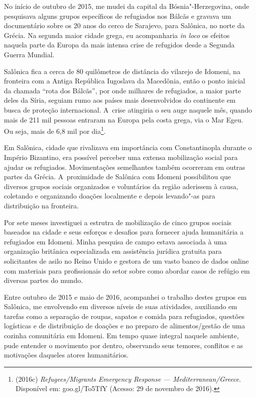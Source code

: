  

No início de outubro de 2015, me mudei da capital da Bósnia"-Herzegovina,
onde pesquisava alguns grupos específicos de refugiados nos Bálcãs e
gravava um documentário sobre os 20 anos do cerco de Sarajevo, para
Salônica, no norte da Grécia. Na segunda maior cidade grega, eu
acompanharia \emph{in loco} os efeitos naquela parte da Europa da mais
intensa crise de refugidos desde a Segunda Guerra Mundial.

Salônica fica a cerca de 80 quilômetros de distância do vilarejo de
Idomeni, na fronteira com a Antiga República Iugoslava da Macedônia,
então o ponto inicial da chamada ``rota dos Bálcãs'', por onde milhares
de refugiados, a maior parte deles da Síria, seguiam rumo aos países
mais desenvolvidos do continente em busca de proteção internacional. A~crise atingiria o seu auge naquele mês, quando mais de 211 mil pessoas
entraram na Europa pela costa grega, via o Mar Egeu. Ou seja, mais de
6,8 mil por dia\footnote{ (2016c) \emph{Refugees/Migrants Emergency Response ---
Mediterranean/Greece}. Disponível em:
goo.gl/To5TfY (Acesso: 29 de
novembro de 2016).}.

Em Salônica, cidade que rivalizava em importância com Constantinopla
durante o Império Bizantino, era possível perceber uma extensa
mobilização social para ajudar os refugiados. Movimentações semelhantes
também ocorreram em outras partes da Grécia. A~proximidade de Salônica
com Idomeni possibilitou que diversos grupos sociais organizados e
voluntários da região aderissem à causa, coletando e organizando doações
localmente e depois levando"-as para distribuição na fronteira.

Por sete meses investiguei a estrutra de mobilização de cinco grupos
sociais baseados na cidade e seus esforços e desafios para fornecer
ajuda humanitária a refugiados em Idomeni. Minha pesquisa de campo
estava associada à uma organização britânica especializada em
assistência jurídica gratuita para solicitantes de asilo no Reino Unido
e gestora de um vasto banco de dados online com materiais para
profissionais do setor sobre como abordar casos de refúgio em diversas
partes do mundo.

Entre outubro de 2015 e maio de 2016, acompanhei o trabalho destes
grupos em Salônica, me envolvendo em diversos níveis de suas atividades,
auxiliando em tarefas como a separação de roupas, sapatos e comida para
refugiados, questões logísticas e de distribuição de doações e no
preparo de alimentos/gestão de uma cozinha comunitária em Idomeni. Em
tempo quase integral naquele ambiente, pude entender o movimento por
dentro, observando seus temores, conflitos e as motivações daqueles
atores humanitários.

